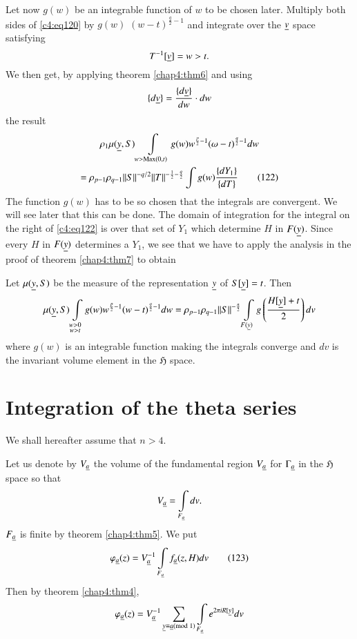 Let now $g(w)$ be an integrable function of $w$ to be chosen
later. Multiply both sides of \eqref{c4:eq120} by $g(w)$
$(w-t)^{\frac{q}{2}-1}$ and integrate over the $\underline{v}$ space
satisfying
$$
T^{-1}[\underline{v}]=w>t.
$$
We then get, by applying theorem \ref{chap4:thm6} and using
$$
\{d\underline{v}\}=\frac{\{d\underline{v}\}}{dw}\cdot dw
$$
the result
\begin{gather*}
\rho_{1}\mu(\underline{y},S)\int\limits_{w>\operatorname{Max}(0,t)}g(w)
w^{\frac{p}{2}-1}(\omega-t)^{\frac{q}{2}-1}dw\\
=\rho_{p-1}\rho_{q-1}||S||^{-q/2}||T||^{- \frac{1}{2} - \frac{q}{2}} 
\int g(w)\frac{\{dY_{1}\}}{\{dT\}}\tag{122}\label{c4:eq122} 
\end{gather*}
The function $g(w)$ has to be so chosen that the integrals are
convergent. We will see later that this can be done. The domain of
integration for the integral on the right of \eqref{c4:eq122} is over that
set of $Y_{1}$ which determine $H$ in $F(\underline{y})$. Since every $H$ in
$F(\underline{y})$ determines a $Y_{1}$, we see that we have to apply the
analysis in the proof of theorem \ref{chap4:thm7} to obtain 

\begin{thm}\label{chap4:thm8}
Let $\mu(\underline{y},S)$ be the measure of the representation $\underline{y}$ of
$S[\underline{y}]=t$. Then
$$
\mu(\underline{y},S)\int\limits_{\substack{w>0\\ w>t}}g(w)w^{\frac{p}{2}-1}(w-t)^{\frac{q}{2}-1}dw=\rho_{p-1}\rho_{q-1}||S||^{-
  \frac{n}{2}}\int\limits_{F(\underline{y})}g\left(\frac{H[\underline{y}]+t}{2}\right)dv  
$$\pageoriginale
where $g(w)$ is an integrable function making the integrals converge
and $dv$ is the invariant volume element in the $\mathfrak{H}$ space.
\end{thm}

\section{Integration of the theta series}\label{chap4:sec7}

We shall hereafter assume that $n>4$.

Let us denote by $V_{\underline{a}}$ the volume of the fundamental region
$V_{\underline{a}}$ for $\Gamma_{\underline{a}}$ in the $\mathfrak{H}$ space so that
$$
V_{\underline{a}}=\int\limits_{F_{\underline{a}}}dv.
$$
$F_{\underline{a}}$ is finite by theorem \ref{chap4:thm5}. We put
\begin{equation*}
\varphi_{\underline{a}}(z)=V^{-1}_{\underline{a}}\int\limits_{F_{\underline{a}}}
f_{\underline{a}}(z,H)dv\tag{123}\label{c4:eq123} 
\end{equation*}
Then by theorem \ref{chap4:thm4},
$$
\varphi_{\underline{a}}(z)=V^{-1}_{\underline{a}}\sum_{\underline{y}\equiv \underline{a}(\rm{mod} \;
  1)}\int\limits_{F_{\underline{a}}} e^{2\pi iR[\underline{y}]}dv
$$

